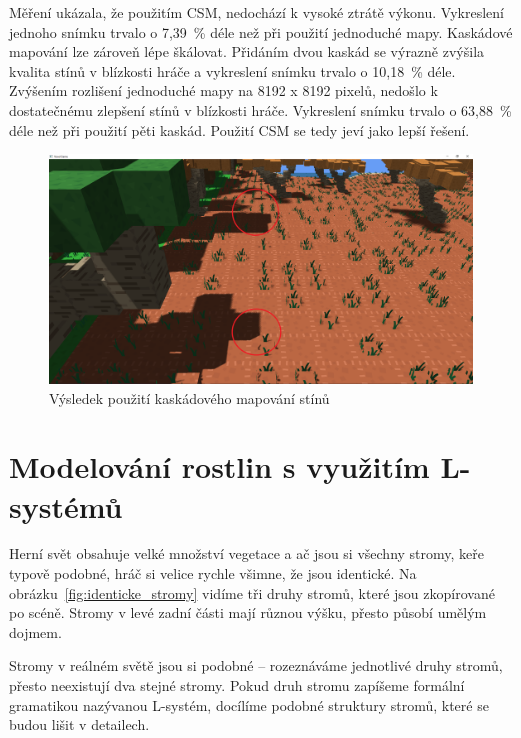 \documentclass[thesis=M,czech]{FITthesis}[2019/12/23]
\begin{document}
Měření ukázala, že použitím CSM, nedochází k vysoké ztrátě výkonu. Vykreslení jednoho snímku trvalo o 7,39~\% déle než při použití jednoduché mapy. Kaskádové mapování lze zároveň lépe škálovat. Přidáním dvou kaskád se výrazně zvýšila kvalita stínů v blízkosti hráče a vykreslení snímku trvalo o 10,18~\% déle.  Zvýšením rozlišení jednoduché mapy na 8192 x 8192 pixelů, nedošlo k dostatečnému zlepšení stínů v blízkosti hráče. Vykreslení snímku trvalo o 63,88~\% déle než při použití pěti kaskád. Použití CSM se tedy jeví jako lepší řešení.

\begin{figure}\centering
	\includegraphics[width=\textwidth]{images/shadows/csm}
	\caption[Výsledek použití kaskádového mapování stínů]{Výsledek použití kaskádového mapování stínů}\label{fig:shadows_csm}
\end{figure}





\chapter{Modelování rostlin s využitím L-systémů}
Herní svět obsahuje velké množství vegetace a ač jsou si všechny stromy, keře typově podobné, hráč si velice rychle všimne, že jsou identické. Na obrázku~\ref{fig:identicke_stromy} vidíme tři druhy stromů, které jsou zkopírované po scéně. Stromy v levé zadní části mají různou výšku, přesto působí umělým dojmem.

Stromy v reálném světě jsou si podobné -- rozeznáváme jednotlivé druhy stromů, přesto neexistují dva stejné stromy. Pokud druh stromu zapíšeme formální gramatikou nazývanou L-systém, docílíme podobné struktury stromů, které se budou lišit v detailech.
\end{document}
